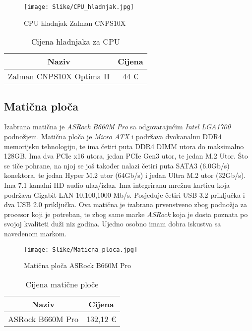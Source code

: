 \documentclass[14pt]{article}
\begin{document}
    \begin{figure}[H]
        \centering
        \texttt{[image: Slike/CPU\_hladnjak.jpg]}
        \caption{CPU hladnjak Zalman CNPS10X}
        \label{fig:Hladnjak}
    \end{figure}

    \begin{table}[H]
        \centering
        \begin{tabular}{|c|c|}
            \hline
            Naziv & Cijena \\
            \hline
            Zalman CNPS10X Optima II & 44 € \\
            \hline
        \end{tabular}
        \caption{Cijena hladnjaka za CPU}
        \label{tab:Hladnjak}
    \end{table}

    \clearpage
    \subsection{Matična ploča}
    Izabrana matična je \textit{ASRock B660M Pro} sa odgovarajućim \textit{Intel LGA1700} podnožjem. Matična ploča je \textit{Micro ATX} i podržava dvokanalnu DDR4 memorijsku tehnologiju, te ima četiri puta DDR4 DIMM utora do maksimalno 128GB. Ima dva PCIe x16 utora, jedan PCIe Gen3 utor, te jedan M.2 Utor. Što se tiče pohrane, na njoj se još također nalazi četiri puta SATA3 (6.0Gb/s) konektora, te jedan Hyper M.2 utor (64Gb/s) i jedan Ultra M.2 utor (32Gb/s). Ima 7.1 kanalni HD audio ulaz/izlaz. Ima integriranu mrežnu karticu koja podržava Gigabit LAN 10,100,1000 Mb/s. Posjeduje četiri USB 3.2 priključka i dva USB 2.0 priključka. Ova matična je izabrana prvenstveno zbog podnožja za procesor koji je potreban, te zbog same marke \textit{ASRock} koja je dosta poznata po svojoj kvaliteti duži niz godina. Ujedno osobno imam dobra iskustva sa navedenom markom.

     \begin{figure}[H]
        \centering
        \texttt{[image: Slike/Maticna\_ploca.jpg]}
        \caption{Matična ploča ASRock B660M Pro}
        \label{fig:Maticna}
    \end{figure}

    \begin{table}[H]
        \centering
        \begin{tabular}{|c|c|}
            \hline
            Naziv & Cijena \\
            \hline
            ASRock B660M Pro & 132,12 € \\
            \hline
        \end{tabular}
        \caption{Cijena matične ploče}
        \label{tab:Maticna}
    \end{table}
\end{document}
